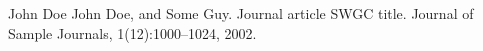 
\begin{enumerate}[{[}1{]}] 
\item John Doe John Doe, and Some Guy. Journal article SWGC title. Journal of
  Sample Journals, 1(12):1000--1024, 2002.
\end{enumerate}

